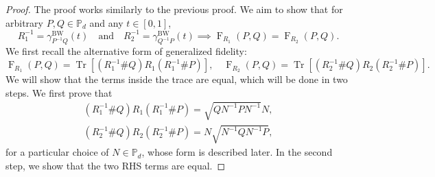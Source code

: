 \documentclass[12pt]{article}
\theoremstyle{definition}
\begin{document}
\begin{proof}
    The proof works similarly to the previous proof. We aim to show that for arbitrary $P, Q \in \mathbb{P}_d$ and any $t \in [0,1]$,
\begin{equation}
R_1 ^{-1}  = \gamma^{\mathrm{BW}}_{P ^{-1} Q}(t) \quad \text{and} \quad R_2 ^{-1}  = \gamma^{\mathrm{BW}}_{Q ^{-1} P}(t) \implies \operatorname{F}_{R_1}(P,Q)  = \operatorname{F}_{R_2}(P,Q).
\end{equation}
We first recall the alternative form of generalized fidelity:
\begin{equation}
\operatorname{F}_{R_1}(P,Q) = \operatorname{Tr}\left[(R_1^{-1} \# Q)  R_1 (R_1^{-1} \# P)\right],
\quad \operatorname{F}_{R_2}(P,Q) = \operatorname{Tr}\left[(R_2^{-1} \# Q) R_2 ( R_2^{-1} \# P)\right].
\end{equation}
We will show that the terms inside the trace are equal, which will be done in two steps. We first prove that 
\begin{align}
    (R_1^{-1} \# Q)  R_1 (R_1^{-1} \# P) = \sqrt{Q N ^{-1}  P  N ^{-1} } N, \\
    (R_2^{-1} \# Q)  R_2 (R_2^{-1} \# P) = N \sqrt{N ^{-1} Q N ^{-1}  P},
\end{align}
for a particular choice of $N \in \mathbb P_d$, whose form is described later. In the second step, we show that the two RHS terms are equal. 


\end{proof}
\end{document}
